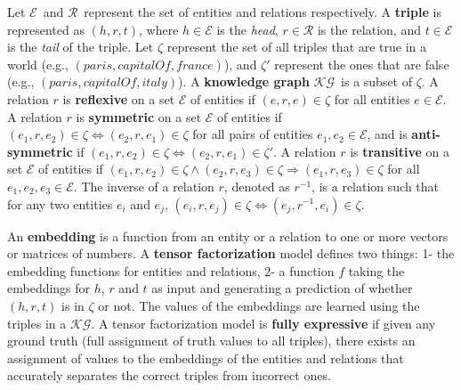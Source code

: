 \documentclass{article}
\newcommand{\entities}{\ensuremath{\mathcal{E}}}
\newcommand{\relations}{\ensuremath{\mathcal{R}}}
\newcommand{\KG}{\ensuremath{\mathcal{KG}}}
\newcommand{\triple}[3]{(\mathit{#1}, \mathit{#2}, \mathit{#3})}
\begin{document}
Let \entities\ and \relations\ represent the set of entities and relations respectively. 
A \textbf{triple} is represented as $\triple{h}{r}{t}$, where $h\in \entities$ is the \emph{head}, $r\in\relations$ is the relation, and $t\in \entities$ is the \emph{tail} of the triple. 
Let $\zeta$ represent the set of all triples that are true in a world (e.g., $\triple{paris}{capitalOf}{france}$), and $\zeta'$ represent the ones that are false (e.g., $\triple{paris}{capitalOf}{italy}$). 
A \textbf{knowledge graph} \KG\ is a subset of $\zeta$. 
A relation $r$ is \textbf{reflexive} on a set $\entities$ of entities if $\triple{e}{r}{e}\in\zeta$ for all entities $e\in \entities$. A relation $r$ is \textbf{symmetric} on a set $\entities$ of entities if $\triple{e_1}{r}{e_2}\in\zeta \iff \triple{e_2}{r}{e_1}\in\zeta$ for all pairs of entities $e_1, e_2 \in \entities$, and is \textbf{anti-symmetric} if $\triple{e_1}{r}{e_2}\in\zeta \iff \triple{e_2}{r}{e_1}\in\zeta'$. A relation $r$ is \textbf{transitive} on a set $\entities$ of entities if $\triple{e_1}{r}{e_2}\in\zeta \wedge \triple{e_2}{r}{e_3}\in\zeta \Rightarrow \triple{e_1}{r}{e_3}\in\zeta$ for all $e_1,e_2,e_3\in \entities$. The inverse of a relation $r$, denoted as $r^{-1}$, is a relation such that for any two entities $e_i$ and $e_j$, $\triple{e_i}{r}{e_j} \in \zeta \iff \triple{e_j}{r^{-1}}{e_i} \in \zeta$. 

An \textbf{embedding} is a function from an entity or a relation to one or more vectors or matrices of numbers. 
A \textbf{tensor factorization} model defines two things: 1- the embedding functions for entities and relations, 2- a function $f$ taking the embeddings for $h$, $r$ and $t$ as input and generating a prediction of whether $\triple{h}{r}{t}$ is in $\zeta$ or not. The values of the embeddings are learned using the triples in a \KG.
A tensor factorization model is \textbf{fully expressive} if given any ground truth (full assignment of truth values to all triples), there exists an assignment of values to the embeddings of the entities and relations that accurately separates the correct triples from incorrect ones. 
\end{document}
